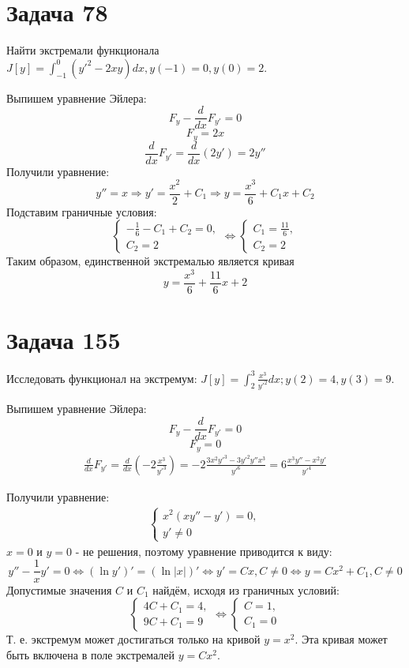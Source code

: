 \documentclass[11pt]{article}
\begin{document}
\section{Задача 78}
\label{sec:org2fbd721}
Найти экстремали функционала \(J[y] = \int_{-1}^0(y'^2 - 2xy)dx, y(-1) = 0, y(0) = 2\).

Выпишем уравнение Эйлера:
$$F_y - \frac{d}{dx}F_{y'} = 0$$
$$F_y = 2x$$
$$\frac{d}{dx}F_{y'} = \frac{d}{dx}(2y') = 2y''$$
Получили уравнение:
$$y'' = x \Rightarrow y' = \frac{x^2}2 + C_1 \Rightarrow y = \frac{x^3}6 + C_1x + C_2$$
Подставим граничные условия:
\begin{equation*}
\begin{cases}
-\frac{1}6 - C_1 + C_2 = 0, \\
C_2 = 2
\end{cases}
\Leftrightarrow
\begin{cases}
C_1 = \frac{11}6, \\
C_2 = 2
\end{cases}
\end{equation*}
Таким образом, единственной экстремалью является кривая
$$y = \frac{x^3}6 + \frac{11}6x + 2$$
\section{Задача 155}
\label{sec:org664489e}
Исследовать функционал на экстремум: \(J[y] = \int_2^3\frac{x^3}{y'^2}dx; y(2) = 4, y(3) = 9\).

Выпишем уравнение Эйлера:
$$F_y - \frac{d}{dx}F_{y'} = 0$$
$$F_y = 0$$
\begin{multline*}
\frac{d}{dx}F_{y'} = \frac{d}{dx}\left(-2\frac{x^3}{y'^3}\right) = -2\frac{3x^2y'^3 - 3y'^2y''x^3}{y'^6}
= 6\frac{x^3y'' - x^2y'}{y'^4}
\end{multline*}

Получили уравнение:
\begin{multline*}
\begin{cases}
x^2(xy'' - y') = 0, \\
y' \neq 0
\end{cases}
\end{multline*}
\(x = 0\) и \(y = 0\) - не решения, поэтому уравнение приводится к виду:
$$y'' - \frac{1}xy' = 0 \Leftrightarrow (\ln y')' = (\ln |x|)' \Leftrightarrow y' = Cx, C \neq 0
\Leftrightarrow y = Cx^2 + C_1, C \neq 0$$
Допустимые значения \(C\) и \(C_1\) найдём, исходя из граничных условий:
\begin{equation*}
\begin{cases}
4C + C_1 = 4, \\
9C + C_1 = 9
\end{cases}
\Leftrightarrow
\begin{cases}
C = 1, \\
C_1 = 0
\end{cases}
\end{equation*}
Т. е. экстремум может достигаться только на кривой \(y = x^2\). Эта кривая может быть включена в поле экстремалей
\(y = Cx^2\).
\end{document}
